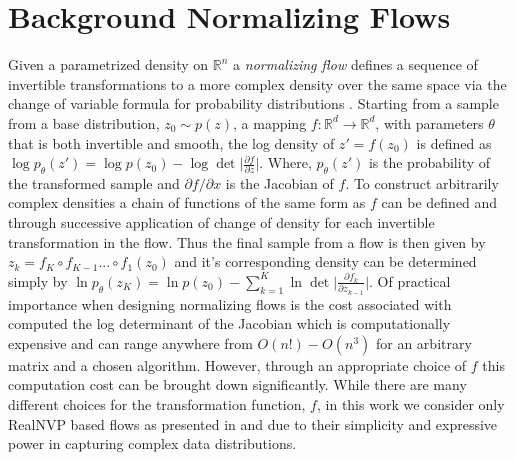 \section{Background Normalizing Flows}
\label{normalizing_flow_appendix}
Given a parametrized density on $\mathbb{R}^n$ a \textit{normalizing flow} defines a sequence of invertible transformations to a more complex density over the same space via the change of variable formula for probability distributions \cite{rezende2015variational}. Starting from a sample from a base distribution, $z_0 \sim p(z)$, a mapping $f: \mathbb{R}^d \to \mathbb{R}^d$, with parameters $\theta$ that is both invertible and smooth, the log density of $z' = f(z_0)$ is defined as $\log p_{\theta}(z') = \log p(z_0) - \log \det \Big \lvert \frac{\partial f}{\partial z} \Big \rvert$.
Where, $p_{\theta}(z')$ is the probability of the transformed sample and $\partial f / \partial x$ is the Jacobian of $f$. To construct arbitrarily complex densities a chain of functions of the same form as $f$ can be defined and through successive application of change of density for each invertible transformation in the flow. Thus the final sample from a flow is then given by $z_k = f_K \circ f_{K-1} ... \circ f_1(z_0)$ and it's corresponding density can be determined simply by $\ln p_{\theta}(z_K) = \ln p(z_0) - \sum_{k=1}^K\ln \det \Big \lvert \frac{\partial f_k}{\partial z_{k-1}} \Big \rvert$. 
Of practical importance when designing normalizing flows is the cost associated with computed the log determinant of the Jacobian which is computationally expensive and can range anywhere from $O(n!)-O(n^3)$ for an arbitrary matrix and a chosen algorithm. However, through an appropriate choice of $f$ this computation cost can be brought down significantly. While there are many different choices for the transformation function, $f$, in this work we consider only RealNVP based flows as presented in \cite{dinh2016density} and \cite{rezende2015variational} due to their simplicity and expressive power in capturing complex data distributions.

